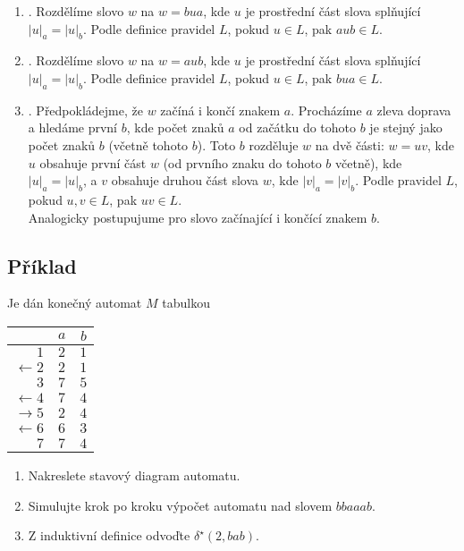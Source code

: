 \begin{enumerate}[label={}]
    \item {}. Rozdělíme slovo $w$ na $w = bua$, kde $u$ je prostřední část slova splňující 
    $|u|_a = |u|_b$. Podle definice pravidel $L$, pokud $u \in L$, pak $aub \in L$. 
    \item {}. Rozdělíme slovo $w$ na $w = aub$, kde $u$ je prostřední část slova splňující 
    $|u|_a = |u|_b$. Podle definice pravidel $L$, pokud $u \in L$, pak $bua \in L$.
    \item {}. Předpokládejme, že $w$ začíná i končí znakem $a$. Procházíme $a$ zleva 
    doprava a hledáme první $b$, kde počet znaků $a$ od začátku do tohoto $b$ je stejný jako počet znaků $b$ (včetně 
    tohoto $b$). Toto $b$ rozděluje $w$ na dvě části: $w = uv$, kde $u$ obsahuje první část $w$ (od prvního znaku do 
    tohoto $b$ včetně), kde $|u|_a = |u|_b$, a $v$ obsahuje druhou část slova $w$, kde $|v|_a = |v|_b$. Podle pravidel 
    $L$, pokud $u, v \in L$, pak $uv \in L$. \\
    Analogicky postupujume pro slovo začínající i končící znakem $b$.
\end{enumerate}

\newpage
\subsection{Příklad}
Je dán konečný automat $M$ tabulkou


\begin{multicols}{2}

\begin{tabular}{|r|c|c|}
    \hline
    & $a$ & $b$\\
    \hline
    \hline
    $1$            & $2$   & $1$\\
    $\leftarrow 2$ & $2$   & $1$\\
    $3$            & $7$   & $5$\\
    $\leftarrow 4$ & $7$   & $4$\\
    $\rightarrow 5$& $2$   & $4$\\
    $\leftarrow 6$ & $6$   & $3$\\
    $ 7$           & $7$   & $4$\\
    \hline
\end{tabular}

\columnbreak

\begin{enumerate}[noitemsep]
    \item Nakreslete stavový diagram automatu.
    \item Simulujte krok po kroku výpočet automatu nad slovem $bbaaab$.
    \item Z induktivní definice odvoďte $\delta^\star(2, bab)$.
\end{enumerate}

\end{multicols}

